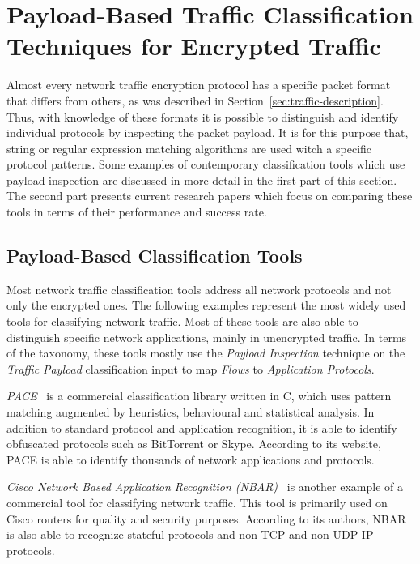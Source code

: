 \section{Payload-Based Traffic Classification Techniques for Encrypted Traffic}\label{sec:payload-classification}


Almost every network traffic encryption protocol has a specific packet format that differs from others, as was described in Section~\ref{sec:traffic-description}. Thus, with knowledge of these formats it is possible to distinguish and identify individual protocols by inspecting the packet payload. It is for this purpose that, string or regular expression matching algorithms are used witch a specific protocol patterns. Some examples of contemporary classification tools which use payload inspection are discussed in more detail in the first part of this section. The second part presents current research papers which focus on comparing these tools in terms of their performance and success rate.


\subsection{Payload-Based Classification Tools}

Most network traffic classification tools address all network protocols and not only the encrypted ones. The following examples represent the most widely used tools for classifying network traffic. Most of these tools are also able to distinguish specific network applications, mainly in unencrypted traffic. In terms of the taxonomy, these tools mostly use the \textit{Payload Inspection} technique on the \textit{Traffic Payload} classification input to map \textit{Flows} to \textit{Application Protocols}.

\textit{PACE}~\cite{pace} is a commercial classification library written in C, which uses pattern matching augmented by heuristics, behavioural and statistical analysis. In addition to standard protocol and application recognition, it is able to identify obfuscated protocols such as BitTorrent or Skype. According to its website, PACE is able to identify thousands of network applications and protocols.

\textit{Cisco Network Based Application Recognition (NBAR)}~\cite{CiscoSystems--Network} is another example of a commercial tool for classifying network traffic. This tool is primarily used on Cisco routers for quality and security purposes. According to its authors, NBAR is also able to recognize stateful protocols and non-TCP and non-UDP IP protocols.

